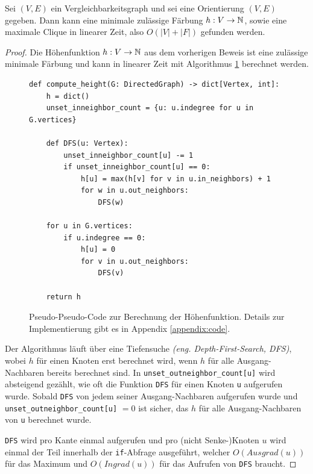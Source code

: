 \documentclass[../main.tex]{subfiles}
\begin{document}
\begin{korollar}
    Sei $(V, E)$ ein Vergleichbarkeitsgraph und sei eine Orientierung $(V, E)$ gegeben. Dann kann eine minimale zulässige Färbung $h : V \to \mathbb{N}$, sowie eine maximale Clique in linearer Zeit, also $O(|V| + |F|)$ gefunden werden.
\end{korollar}
\begin{proof}
    
    Die Höhenfunktion $h: V \to \mathbb{N}$ aus dem vorherigen Beweis ist eine zulässige minimale Färbung und kann in linearer Zeit mit Algorithmus \ref{algo:heightfunction} berechnet werden.
    
    \begin{figure}[ht]
        \label{algo:heightfunction}
        \centering
        \begin{verbatim}
def compute_height(G: DirectedGraph) -> dict[Vertex, int]:
    h = dict()
    unset_inneighbor_count = {u: u.indegree for u in G.vertices}
    
    def DFS(u: Vertex):
        unset_inneighbor_count[u] -= 1
        if unset_inneighbor_count[u] == 0:
            h[u] = max(h[v] for v in u.in_neighbors) + 1
            for w in u.out_neighbors:
                DFS(w)
        
    for u in G.vertices:
        if u.indegree == 0:
            h[u] = 0
            for v in u.out_neighbors:
                DFS(v)
    
    return h
        \end{verbatim}
        \caption{Pseudo-Pseudo-Code zur Berechnung der Höhenfunktion. Details zur Implementierung gibt es in Appendix \ref{appendix:code}.}
    \end{figure}
    
    Der Algorithmus läuft über eine Tiefensuche \emph{(eng. Depth-First-Search, DFS)}, wobei $h$ für einen Knoten erst berechnet wird, wenn $h$ für alle Ausgang-Nachbaren bereits berechnet sind. In \verb|unset_outneighbor_count[u]| wird absteigend gezählt, wie oft die Funktion \verb|DFS| für einen Knoten \verb|u| aufgerufen wurde. Sobald \verb|DFS| von jedem seiner Ausgang-Nachbaren aufgerufen wurde und \verb|unset_outneighbor_count[u]| $= 0$ ist sicher, das $h$ für alle Ausgang-Nachbaren von \verb|u| berechnet wurde.
    
    \verb|DFS| wird pro Kante einmal aufgerufen und pro (nicht Senke-)Knoten $u$ wird einmal der Teil innerhalb der \verb|if|-Abfrage ausgeführt, welcher $O(Ausgrad(u))$ für das Maximum und $O(Ingrad(u))$ für das Aufrufen von \verb|DFS| braucht.
    

\end{proof}
\end{document}
